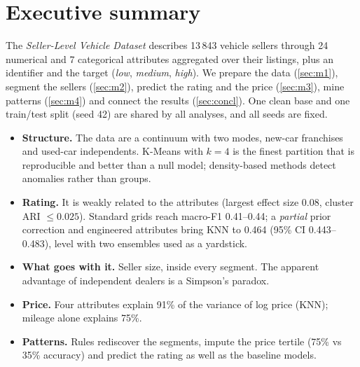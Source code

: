 \section{Executive summary}\label{sec:intro}
The \emph{Seller-Level Vehicle Dataset} describes 13\,843 vehicle sellers through 24 numerical and 7 categorical attributes aggregated over their listings, plus an identifier and the target  (\emph{low}, \emph{medium}, \emph{high}). We prepare the data (\cref{sec:m1}), segment the sellers (\cref{sec:m2}), predict the rating and the price (\cref{sec:m3}), mine patterns (\cref{sec:m4}) and connect the results (\cref{sec:concl}). One clean base and one train/test split (seed 42) are shared by all analyses, and all seeds are fixed.

\begin{itemize}
\item \textbf{Structure.} The data are a continuum with two modes, new-car franchises and used-car independents. K-Means with $k=4$ is the finest partition that is reproducible and better than a null model; density-based methods detect anomalies rather than groups.
\item \textbf{Rating.} It is weakly related to the attributes (largest effect size 0.08, cluster ARI $\leq0.025$). Standard grids reach macro-F1 0.41--0.44; a \emph{partial} prior correction and engineered attributes bring KNN to 0.464 (95\% CI 0.443--0.483), level with two ensembles used as a yardstick.
\item \textbf{What goes with it.} Seller size, inside every segment. The apparent advantage of independent dealers is a Simpson's paradox.
\item \textbf{Price.} Four attributes explain 91\% of the variance of log price (KNN); mileage alone explains 75\%.
\item \textbf{Patterns.} Rules rediscover the segments, impute the price tertile (75\% vs 35\% accuracy) and predict the rating as well as the baseline models.
\end{itemize}
